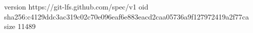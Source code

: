 version https://git-lfs.github.com/spec/v1
oid sha256:c4129ddc3ac319c02c70e096eaf6e883eacd2caa05736a9f127972419a2f77ca
size 11489
